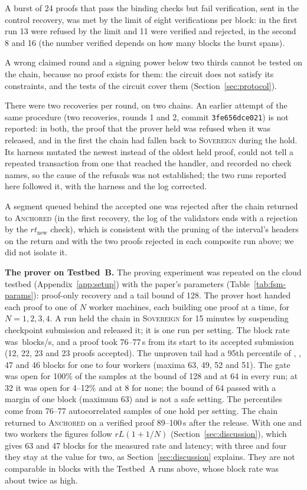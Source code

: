 A burst of 24 proofs that pass the binding checks but fail verification, sent in the control recovery, was met by the limit of eight verifications per block: in the first run 13 were refused by the limit and 11 were verified and rejected, in the second 8 and 16 (the number verified depends on how many blocks the burst spans).

A wrong claimed round and a signing power below two thirds cannot be tested on the chain, because no proof exists for them: the circuit does not satisfy its constraints, and the tests of the circuit cover them (Section~\ref{sec:protocol}).

There were two recoveries per round, on two chains. An earlier attempt of the same procedure (two recoveries, rounds 1 and 2, commit \texttt{3fe656dce021}) is not reported: in both, the proof that the prover held was refused when it was released, and in the first the chain had fallen back to \textsc{Sovereign} during the hold. Its harness mutated the newest instead of the oldest held proof, could not tell a repeated transaction from one that reached the handler, and recorded no check names, so the cause of the refusals was not established; the two runs reported here followed it, with the harness and the log corrected.

A segment queued behind the accepted one was rejected after the chain returned to \textsc{Anchored} (in the first recovery, the log of the validators ends with a rejection by the $rt_{\text{new}}$ check), which is consistent with the pruning of the interval's headers on the return and with the two proofs rejected in each composite run above; we did not isolate it.

\textbf{The prover on Testbed~B.} The proving experiment was repeated on the cloud testbed
(Appendix~\ref{app:setup}) with the paper's parameters (Table~\ref{tab:fsm-params}): proof-only recovery and a tail bound of 128. The
prover host handed each proof to one of $N$ worker machines, each building one proof at a time, for $N{=}1,2,3,4$.
A run held the chain in \textsc{Sovereign} for 15 minutes by suspending checkpoint submission and released it; it is one run per
setting. The block rate was \resCloudRate\,blocks/s, and a proof took 76--77\,s from its start to its accepted submission
(12, 22, 23 and 23 proofs accepted). The unproven tail had a 95th percentile of \resCloudTailOne{}, \resCloudTailTwo{}, 47 and 46 blocks
for one to four workers (maxima 63, 49, 52 and 51). The gate was open for 100\% of the samples at the bound of 128 and at 64 in every run;
at 32 it was open for 4--12\% and at 8 for none; the bound of 64 passed with a margin of one block (maximum 63) and is not a safe setting. The percentiles come from 76--77 autocorrelated samples of one hold per setting. The chain returned to \textsc{Anchored} on a verified proof 89--100\,s after the release.
With one and two workers the figures follow $rL(1+1/N)$ (Section~\ref{sec:discussion}), which gives 63 and 47 blocks
for the measured rate and latency; with three and four they stay at the value for two, as Section~\ref{sec:discussion} explains.
They are not comparable in blocks with the Testbed~A runs above, whose block rate was about twice as high.

